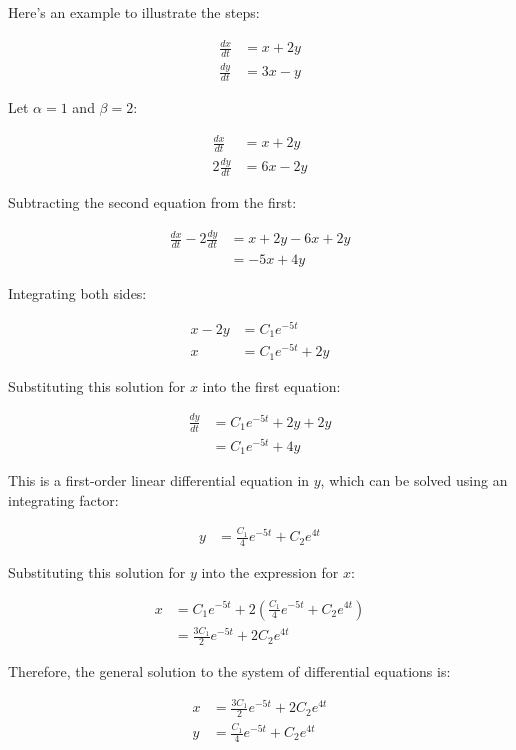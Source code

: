 \documentclass[a4paper,12pt]{article}
\begin{document}
Here's an example to illustrate the steps:

\begin{align*}
\frac{dx}{dt} &= x + 2y \\
\frac{dy}{dt} &= 3x - y
\end{align*}

Let $\alpha = 1$ and $\beta = 2$:

\begin{align*}
\frac{dx}{dt} &= x + 2y \\
2 \frac{dy}{dt} &= 6x - 2y
\end{align*}

Subtracting the second equation from the first:

\begin{align*}
\frac{dx}{dt} - 2 \frac{dy}{dt} &= x + 2y - 6x + 2y \\
&= -5x + 4y
\end{align*}

Integrating both sides:

\begin{align*}
x - 2y &= C_1 e^{-5t} \\
x &= C_1 e^{-5t} + 2y
\end{align*}

Substituting this solution for $x$ into the first equation:

\begin{align*}
\frac{dy}{dt} &= C_1 e^{-5t} + 2y + 2y \\
&= C_1 e^{-5t} + 4y
\end{align*}

This is a first-order linear differential equation in $y$, which can be solved using an integrating factor:

\begin{align*}
y &= \frac{C_1}{4} e^{-5t} + C_2 e^{4t}
\end{align*}

Substituting this solution for $y$ into the expression for $x$:

\begin{align*}
x &= C_1 e^{-5t} + 2 \left(\frac{C_1}{4} e^{-5t} + C_2 e^{4t}\right) \\
&= \frac{3C_1}{2} e^{-5t} + 2C_2 e^{4t}
\end{align*}

Therefore, the general solution to the system of differential equations is:

\begin{align*}
x &= \frac{3C_1}{2} e^{-5t} + 2C_2 e^{4t} \\
y &= \frac{C_1}{4} e^{-5t} + C_2 e^{4t}
\end{align*}
\end{document}
